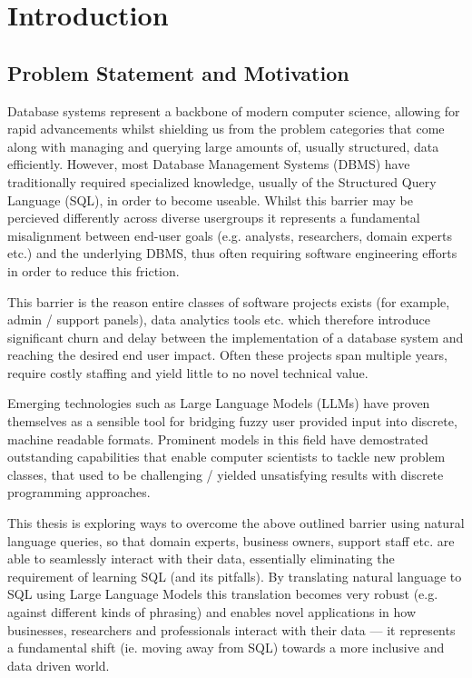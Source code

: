 \documentclass{article}
\begin{document}
\newpage


\section{Introduction}
\subsection{Problem Statement and Motivation}

Database systems represent a backbone of modern computer science, allowing for rapid advancements
whilst shielding us from the problem categories that come along with managing and querying large amounts
of, usually structured, data efficiently. However, most Database Management Systems (DBMS) have
traditionally required specialized knowledge, usually of the Structured Query Language (SQL), in order
to become useable. Whilst this barrier may be percieved differently across diverse usergroups it
represents a fundamental misalignment between end-user goals (e.g. analysts, researchers, domain experts
etc.) and the underlying DBMS, thus often requiring software engineering efforts in order to reduce this friction.

This barrier is the reason entire classes of software projects exists (for example, admin / support panels),
data analytics tools etc. which therefore introduce significant churn and delay between the implementation
of a database system and reaching the desired end user impact. Often these projects span multiple years, require
costly staffing and yield little to no novel technical value.

Emerging technologies such as Large Language Models (LLMs) have proven themselves as a sensible tool for bridging
fuzzy user provided input into discrete, machine readable formats. Prominent models in this field have demostrated
outstanding capabilities that enable computer scientists to tackle new problem classes, that used to be
challenging / yielded unsatisfying results with discrete programming approaches.

This thesis is exploring ways to overcome the above outlined barrier using natural language queries, so that domain experts,
business owners, support staff etc. are able to seamlessly interact with their data, essentially eliminating the
requirement of learning SQL (and its pitfalls). By translating natural language to SQL using Large Language Models
this translation becomes very robust (e.g. against different kinds of phrasing) and enables novel applications
in how businesses, researchers and professionals interact with their data — it represents a fundamental shift 
(ie. moving away from SQL) towards a more inclusive and data driven world. 
\end{document}
